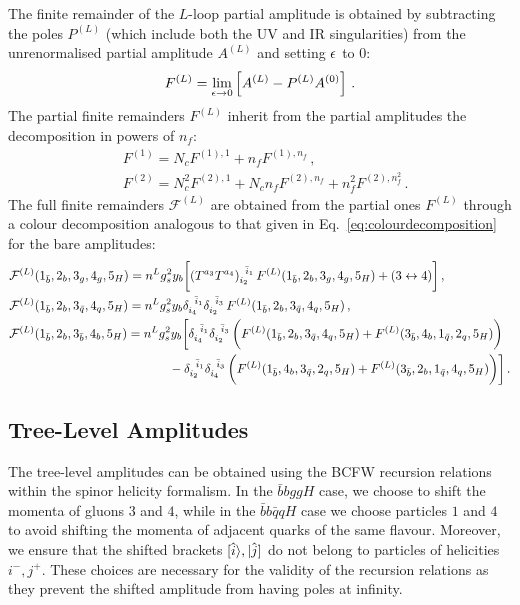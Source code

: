 \documentclass[main.tex]{subfiles}
\begin{document}
The finite remainder of the $L$-loop partial amplitude is obtained by subtracting the poles $P^{(L)}$ (which include both the UV and IR singularities) from the unrenormalised partial amplitude $A^{(L)}$ and setting $\epsilon$ to $0$:
\begin{equation}
F^{(L)} = \lim_{\epsilon \to 0} \left[ A^{(L)} - P^{(L)} A^{(0)} \right]\,.
\label{eq:finiteremainder}
\end{equation}
The partial finite remainders $F^{(L)}$ inherit from the partial amplitudes the decomposition in powers of $n_f$:
\begin{align}
& F^{(1)} = N_c F^{(1),1} + n_f F^{(1),n_f}  \,,  
\label{eq:NfDecomposition1LF} \\
& F^{(2)} = N_c^2 F^{(2),1} + N_c n_f F^{(2),n_f} + n_f^2 F^{(2),n_f^2}  \,.
\label{eq:NfDecomposition2LF}
\end{align}
The full finite remainders $\mathcal{F}^{(L)}$ are obtained from the partial ones $F^{(L)}$ through a colour decomposition analogous to that given in Eq.~\ref{eq:colourdecomposition} for the bare amplitudes:
\begin{align}
&\mathcal{F}^{(L)}(1_{\bar b},2_{b},3_{g},4_{g} ,5_{H}) = n^L g_s^2 y_b \bigg[ 
  (T^{a_3} T^{a_4})_{i_2}^{\;\;\bar i_1} \,  F^{(L)}(1_{\bar b},2_{b},3_{g},4_{g} ,5_{H}) + ( 3 \leftrightarrow 4 ) \bigg]\,, \nonumber\\
&\mathcal{F}^{(L)}(1_{\bar b},2_{b},3_{\bar{q}},4_{q} ,5_{H}) = n^L  g_s^2 y_b 
 \delta_{i_4}^{\;\;\bar i_1} \delta_{i_2}^{\;\;\bar i_3}  \,
  F^{(L)}(1_{\bar b},2_{b},3_{\bar{q}},4_{q} ,5_{H}) \,,  \label{eq:colourdecompositionF} \\
&\mathcal{F}^{(L)}(1_{\bar b},2_{b},3_{\bar{b}},4_{b} ,5_{H}) = n^L  g_s^2 y_b \bigg[
  \delta_{i_4}^{\;\;\bar i_1} \delta_{i_2}^{\;\;\bar i_3}  \, \biggl( F^{(L)}(1_{\bar b},2_{b},3_{\bar{q}},4_{q} ,5_{H}) + F^{(L)}(3_{\bar b},4_{b},1_{\bar{q}},2_{q} ,5_{H}) \biggr) \,  \nonumber\\
& \hspace{4.5cm} -\delta_{i_2}^{\;\;\bar i_1} \delta_{i_4}^{\;\;\bar i_3}  \, \biggl( F^{(L)}(1_{\bar b},4_{b},3_{\bar{q}},2_{q} ,5_{H}) + F^{(L)}(3_{\bar b},2_{b},1_{\bar{q}},4_{q} ,5_{H}) \biggr) \bigg]\,.
\nonumber 
\end{align}


\subsection{Tree-Level Amplitudes}
\label{Hbbsec:trees}
The tree-level amplitudes can be obtained using the BCFW recursion relations~\cite{Britto:2004ap,Britto:2005fq} within the spinor helicity formalism. In the $\bar{b}bggH$ case, we choose to shift the momenta of gluons $3$ and $4$, while in the $\bar{b}b\bar{q}qH$ case we choose particles $1$ and $4$ to avoid shifting the momenta of adjacent quarks of the same flavour. Moreover, we ensure that the shifted brackets $[\hat{i}\rangle, |\hat{j}]$ do not belong to particles of helicities $i^-, j^+$. These choices are necessary for the validity of the recursion relations as they prevent the shifted amplitude from having poles at infinity.
\end{document}
